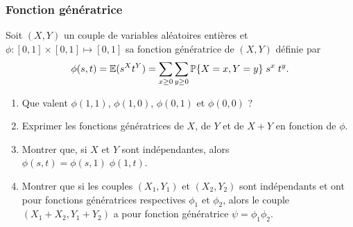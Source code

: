 \subsubsection{Fonction génératrice }

Soit $(X, Y)$ un couple de variables aléatoires entières et $\phi: [0, 1] \times [0, 1] \mapsto [0, 1]$ sa fonction génératrice de $(X, Y)$ définie par 
$$
\phi(s, t) = \operatorname{\mathbb{E}}(s^X t^Y) = \sum_{x \geq 0} \sum_{y \geq 0} \operatorname{\mathbb{P}}\{X=x, Y=y\} \; s^x \; t^y.
$$
\begin{enumerate}
  \item Que valent $\phi(1, 1)$, $\phi(1, 0)$, $\phi(0, 1)$ et $\phi(0, 0)$ ?
  \item Exprimer les fonctions génératrices de $X$, de $Y$ et de $X+Y$ en fonction de $\phi$.
  \item Montrer que, si $X$ et $Y$ sont indépendantes, alors $\phi(s, t) = \phi(s, 1) \; \phi(1, t)$.
  \item Montrer que si les couples $(X_1, Y_1)$ et $(X_2, Y_2)$ sont indépendants et ont pour fonctions génératrices respectives $\phi_1$ et $\phi_2$, alors le couple $(X_1+X_2, Y_1+Y_2)$ a pour fonction génératrice $\psi = \phi_1 \phi_2$. 
\end{enumerate}
